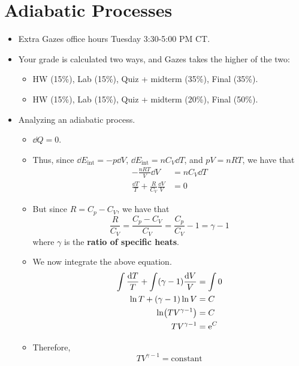 \documentclass[../notes.tex]{subfiles}
\begin{document}
\section{Adiabatic Processes}
\begin{itemize}
    \item {}Extra Gazes office hours Tuesday 3:30-5:00 PM CT.
    \item Your grade is calculated two ways, and Gazes takes the higher of the two:
    \begin{itemize}
        \item HW (15\%), Lab (15\%), Quiz + midterm (35\%), Final (35\%).
        \item HW (15\%), Lab (15\%), Quiz + midterm (20\%), Final (50\%).
    \end{itemize}
    \item Analyzing an adiabatic process.
    \begin{itemize}
        \item $\dd{Q}=0$.
        \item Thus, since $\dd{E_\text{int}}=-p\dd{V}$, $\dd{E_\text{int}}=nC_V\dd{T}$, and $pV=nRT$, we have that
        \begin{align*}
            -\frac{nRT}{V}\dd{V} &= nC_V\dd{T}\\
            \frac{\dd{T}}{T}+\frac{R}{C_V}\frac{\dd{V}}{V} &= 0
        \end{align*}
        \item But since $R=C_p-C_V$, we have that
        \begin{equation*}
            \frac{R}{C_V} = \frac{C_p-C_V}{C_V} = \frac{C_p}{C_V}-1 = \gamma-1
        \end{equation*}
        where $\gamma$ is the \textbf{ratio of specific heats}.
        \item We now integrate the above equation.
        \begin{align*}
            \int\frac{\dd{T}}{T}+\int(\gamma-1)\frac{\dd{V}}{V} &= \int 0\\
            \ln T+(\gamma-1)\ln V &= C\\
            \ln(TV^{\gamma-1}) &= C\\
            TV^{\gamma-1} &= \e[C]
        \end{align*}
        \item Therefore,
        \begin{equation*}
            TV^{\gamma-1} = \text{constant}
        \end{equation*}

\end{itemize}
\end{itemize}
\end{document}
